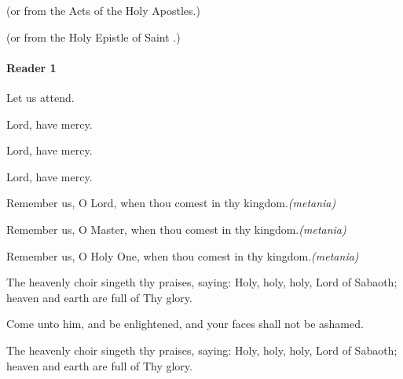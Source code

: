 \documentclass[twoside, letterpaper, 12pt]{report}
\begin{document}
  (or from the Acts of the Holy Apostles.)
  
  (or from the Holy Epistle of Saint \underline{\hspace{1cm}}.)

\paragraph{Reader 1} Let us attend.






\begin{reader}
\item Lord, have mercy. 
\item Lord, have mercy. 
\item Lord, have mercy. 
\end{reader}


\newcommand\metania{\emph{(metania)}}
Remember us, O Lord, when thou comest in thy kingdom.\metania

Remember us, O Master, when thou comest in thy kingdom.\metania

Remember us, O Holy One, when thou comest in thy kingdom.\metania

The heavenly choir singeth thy praises, saying: Holy, holy, holy, Lord of Sabaoth; heaven and earth are full of Thy glory.

Come unto him, and be enlightened, and your faces shall not be ashamed.

The heavenly choir singeth thy praises, saying: Holy, holy, holy, Lord of Sabaoth; heaven and earth are full of Thy glory.

\emph{\glory}
\end{document}
